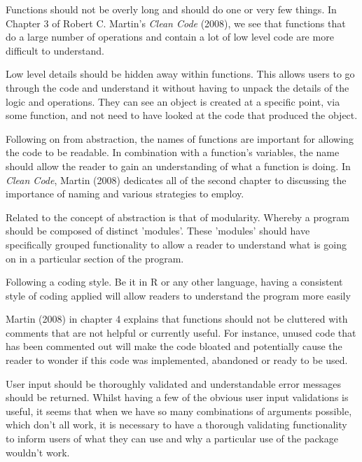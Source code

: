 \documentclass{memoir}\usepackage[]{graphicx}\usepackage[]{color}
\makeatletter
\def\namedlabel#1#2{\begingroup
    #2%
    \def\@currentlabel{#2}%
    \phantomsection\label{#1}\endgroup
}
\makeatother
\begin{document}

\begin{description}[style=multiline, labelwidth=2cm]
	\item[\namedlabel{itm:p1}{functions}] Functions should not be overly long and should do one or very few things. In Chapter 3 of Robert C. Martin's \textit{Clean Code} (2008), we see that functions that do a large number of operations and contain a lot of low level code are more difficult to understand.\cite{mar08}
	\item[\namedlabel{itm:p2}{abstraction}] Low level details should be hidden away within functions. This allows users to go through the code and understand it without having to unpack the details of the logic and operations. They can see an object is created at a specific point, via some function, and not need to have looked at the code that produced the object.
	\item[\namedlabel{itm:p3}{naming}] Following on from abstraction, the names of functions are important for allowing the code to be readable. In combination with a function's variables, the name should allow the reader to gain an understanding of what a function is doing. In \textit{Clean Code}, Martin (2008) dedicates all of the second chapter to discussing the importance of naming and various strategies to employ.\cite{mar08}
    \item[\namedlabel{itm:p3a}{modularity}] Related to the concept of abstraction is that of modularity. Whereby a program should be composed of distinct 'modules'.\cite{woo82} These 'modules' should have specifically grouped functionality to allow a reader to understand what is going on in a particular section of the program.
	\item[\namedlabel{itm:p4}{style}] Following a coding style. Be it in R or any other language, having a consistent style of coding applied will allow readers to understand the program more easily
	\item[\namedlabel{itm:p5}{comments}] Martin (2008) in chapter 4  explains that functions should not be cluttered with comments that are not helpful or currently useful.\cite{mar08} For instance, unused code that has been commented out will make the code bloated and potentially cause the reader to wonder if this code was implemented, abandoned or ready to be used.
	\item[\namedlabel{itm:p6}{validation}] User input should be thoroughly validated and understandable error messages should be returned.\cite{ibm} Whilst having a few of the obvious user input validations is useful, it seems that when we have so many combinations of arguments possible, which don't all work, it is necessary to have a thorough validating functionality to inform users of what they can use and why a particular use of the package wouldn't work.

\end{description}
\end{document}

